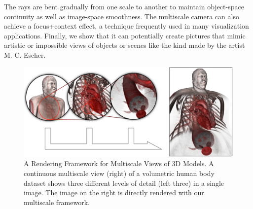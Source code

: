   The rays are bent gradually from one scale to another to maintain object-space continuity as well as image-space smoothness. The multiscale camera can also achieve a focus+context effect, a technique frequently used in many visualization applications. Finally, we show that it can potentially create pictures that mimic artistic or impossible views of objects or scenes like the kind made by the artist M. C. Escher. 
 
\begin{figure}[th]
\centering
\includegraphics[width=\textwidth]{Figures/multiscale3d}
\decoRule
\caption[ multiscale ]{ A Rendering Framework for Multiscale Views of 3D Models. A continuous multiscale view (right) of a volumetric human body dataset shows three different levels of detail (left three) in a single image. The image on the right is directly rendered with our multiscale framework.}
\label{fig:multiscale}
\end{figure} 
 
